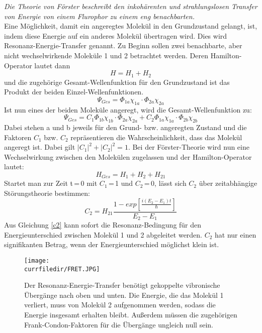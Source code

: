 \textit{Die Theorie von Förster beschreibt  den inkohärenten und
strahlungslosen Transfer  von Energie von einem Flurophor zu
einem eng benachbarten.}\\
Eine Möglichkeit, damit ein angeregtes Molekül in den Grundzustand gelangt, ist, indem diese Energie auf ein anderes Molekül übertragen wird. Dies wird Resonanz-Energie-Transfer genannt.
Zu Beginn sollen zwei benachbarte, aber nicht wechselwirkende Moleküle 1 und 2 betrachtet werden. Deren Hamilton-Operator lautet dann
\begin{equation*}
    H = H_1 + H_2
\end{equation*}
und die zugehörige Gesamt-Wellenfunktion für den Grundzustand ist das Produkt der beiden Einzel-Wellenfunktionen.
\begin{equation*}
    \Psi_{Ges} = \Phi_{1a} \chi_{1a}\cdot \Phi_{2a} \chi_{2a}
\end{equation*}
Ist nun eines der beiden Moleküle angeregt, wird die Gesamt-Wellenfunktion zu:
\begin{equation*}
    \Psi_{Ges} = C_1 \Phi_{1b} \chi_{1b}\cdot \Phi_{2a} \chi_{2a} + C_2 \Phi_{1a} \chi_{1a}\cdot \Phi_{2b} \chi_{2b}
\end{equation*}
Dabei stehen a und b jeweils für den Grund- bzw. angeregten Zustand und die Faktoren $C_1$ bzw. $C_2$ repräsentieren die Wahrscheinlichkeit, dass das Molekül angeregt ist. Dabei gilt $|C_1|^2 + |C_2|^2 = 1$.
Bei der Förster-Theorie wird nun eine Wechselwirkung zwischen den Molekülen zugelassen und der Hamilton-Operator lautet:
\begin{equation*}
    H_{Ges} = H_1 + H_2 + H_{21}
\end{equation*}
Startet man zur Zeit t\,=\,0 mit $C_1$\,=\,1 und $C_2$\,=\,0, lässt sich $C_2$ über zeitabhängige Störungstheorie bestimmen:
\begin{equation}
    C_2 = H_{21}\frac{1 - exp\left[\frac{i(E_2 - E_1)t}{\hbar}\right]}{E_2 - E_1}
    \label{c2}
\end{equation}
Aus Gleichung \ref{c2} kann sofort die Resonanz-Bedingung für den Energieunterschied zwischen Molekül 1 und 2 abgeleitet werden. $C_2$ hat nur einen signifikanten Betrag, wenn der Energieunterschied möglichst klein ist.
\begin{figure}
\label{Resonanz}
\center
    \texttt{[image: \\currfiledir/FRET.JPG]}
    \caption{Der Resonanz-Energie-Transfer benötigt gekoppelte vibronische Übergänge nach oben und unten. Die Energie, die das Molekül 1 verliert, muss von Molekül 2 aufgenommen werden, sodass die Energie insgesamt erhalten bleibt. Außerdem müssen die zugehörigen Frank-Condon-Faktoren für die Übergänge ungleich null sein.}
\end{figure}

